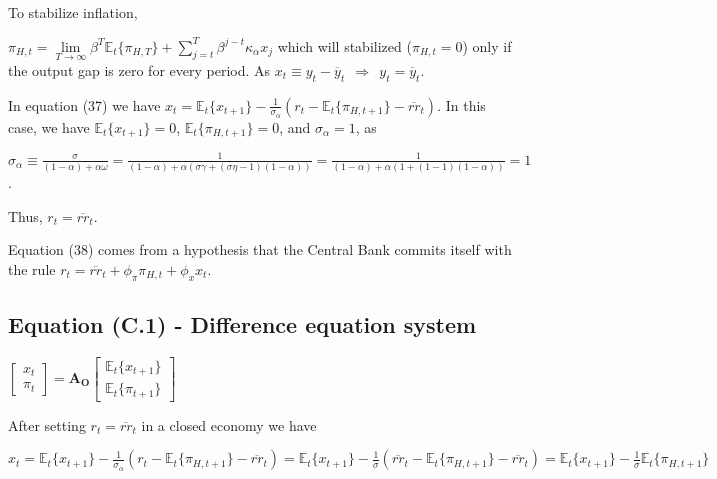 \documentclass[
]{article}
\begin{document}
To stabilize inflation,

\(\displaystyle \pi_{H,t} =\underset{T \rightarrow \infty} \lim\beta^T \mathbb{E}_t\{\pi_{H,T}\} + \sum_{j=t}^T \beta^{j-t}\kappa_\alpha x_j\)
which will stabilized (\(\pi_{H,t}=0\)) only if the output gap is zero
for every period. As
\(x_t \equiv y_t-\overline{y}_t \ \ \Rightarrow \ \ y_t=\overline{y}_t\).

In equation (37) we have
\(\displaystyle x_t = \mathbb{E}_t\{x_{t+1}\} -\frac{1}{\sigma_\alpha}(r_t-\mathbb{E}_t\{\pi_{H,t+1}\} -\overline{rr}_t)\).
In this case, we have \(\mathbb{E}_t\{x_{t+1}\}=0\),
\(\mathbb{E}_t\{\pi_{H,t+1}\}=0\), and \(\sigma_\alpha=1\), as

\(\displaystyle \sigma_\alpha \equiv \frac{\sigma}{(1-\alpha)+\alpha \omega}=\frac{1}{(1-\alpha)+\alpha (\sigma \gamma+(\sigma \eta -1 )(1-\alpha))}=\frac{1}{(1-\alpha)+\alpha (1+(1 -1 )(1-\alpha))}=1\).

Thus, \(r_t=\overline{rr}_t\).

Equation (38) comes from a hypothesis that the Central Bank commits
itself with the rule
\(r_t=\overline{rr}_t+\phi_\pi \pi_{H,t}+\phi_x x_t\).

\vspace{12pt}

\hypertarget{equation-c.1---difference-equation-system}{%
\subsection{Equation (C.1) - Difference equation
system}\label{equation-c.1---difference-equation-system}}

\(\displaystyle \left[ \begin{matrix} x_t\\ \pi_t \end{matrix} \right] =\mathbf{A_O} \left[ \begin{matrix} \mathbb{E}_t\{x_{t+1} \}\\ \mathbb{E}_t \{\pi_{t+1} \} \end{matrix} \right]\)

\vspace{8pt}

After setting \(r_t=\overline{rr}_t\) in a closed economy we have

\(\displaystyle x_t = \mathbb{E}_t\{x_{t+1}\} -\frac{1}{\sigma_\alpha}(r_t-\mathbb{E}_t\{\pi_{H,t+1}\} -\overline{rr}_t) = \mathbb{E}_t\{x_{t+1}\} -\frac{1}{\sigma}(\overline{rr}_t-\mathbb{E}_t\{\pi_{H,t+1}\} -\overline{rr}_t) = \mathbb{E}_t\{x_{t+1}\} -\frac{1}{\sigma}\mathbb{E}_t\{\pi_{H,t+1}\}\)
\end{document}
